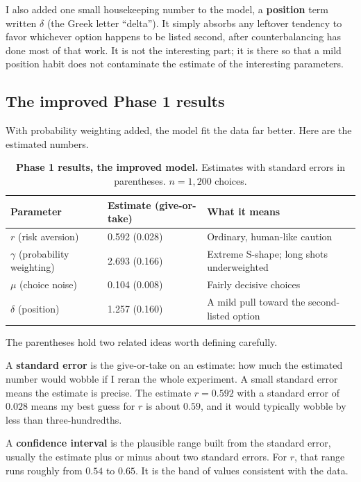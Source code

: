 \documentclass[11pt]{article}
\newcommand{\term}[1]{\textbf{\color{mossdk}#1}}
\begin{document}
I also added one small housekeeping number to the model, a \term{position} term written $\delta$ (the
Greek letter ``delta''). It simply absorbs any leftover tendency to favor whichever option happens to
be listed second, after counterbalancing has done most of that work. It is not the interesting part; it
is there so that a mild position habit does not contaminate the estimate of the interesting parameters.

\subsection{The improved Phase 1 results}

With probability weighting added, the model fit the data far better. Here are the estimated numbers.

\begin{table}[h]
\centering
\small
\caption*{\small\textbf{Phase 1 results, the improved model.} Estimates with standard errors in
parentheses. $n = 1{,}200$ choices.}
\begin{tabular}{@{}l l l@{}}
\toprule
\textbf{Parameter} & \textbf{Estimate (give-or-take)} & \textbf{What it means} \\
\midrule
$r$ (risk aversion)       & 0.592 (0.028) & Ordinary, human-like caution \\
$\gamma$ (probability weighting) & 2.693 (0.166) & Extreme S-shape; long shots underweighted \\
$\mu$ (choice noise)      & 0.104 (0.008) & Fairly decisive choices \\
$\delta$ (position)       & 1.257 (0.160) & A mild pull toward the second-listed option \\
\bottomrule
\end{tabular}
\end{table}

The parentheses hold two related ideas worth defining carefully.

\begin{defbox}
A \term{standard error} is the give-or-take on an estimate: how much the estimated number would wobble
if I reran the whole experiment. A small standard error means the estimate is precise. The estimate
$r = 0.592$ with a standard error of $0.028$ means my best guess for $r$ is about $0.59$, and it would
typically wobble by less than three-hundredths.

\smallskip
A \term{confidence interval} is the plausible range built from the standard error, usually the estimate
plus or minus about two standard errors. For $r$, that range runs roughly from $0.54$ to $0.65$. It is
the band of values consistent with the data.
\end{defbox}
\end{document}
